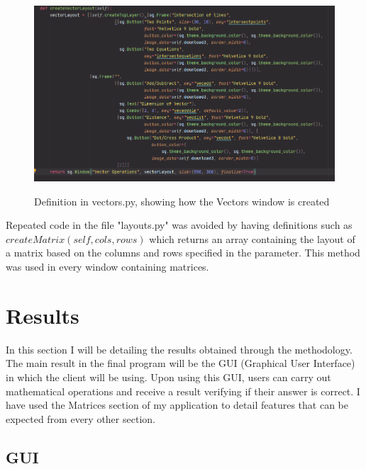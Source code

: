 \documentclass[final]{cmpreport}
\begin{document}
	\begin{figure}[H]
		\caption{Definition in vectors.py, showing how the Vectors window is created}
		\centering
		\includegraphics[scale=0.7]{veclayout.png}
		\label{fig:veclayout}
	\end{figure}
	Repeated code in the file "layouts.py" was avoided by having definitions such as $createMatrix(self, cols, rows)$ which returns an array containing the layout of a matrix based on the columns and rows specified in the parameter. This method was used in every window containing matrices.
	
	\section{Results} \label{sec:results}
	
	In this section I will be detailing the results obtained through the methodology. The main result in the final program will be the GUI (Graphical User Interface) in which the client will be using. Upon using this GUI, users can carry out mathematical operations and receive a result verifying if their answer is correct. I have used the Matrices section of my application to detail features that can be expected from every other section.\\
	
	\subsection{GUI} \label{sec:gui}
	
\end{document}
